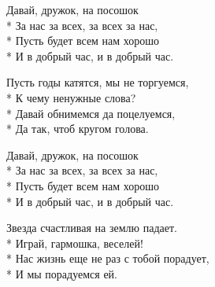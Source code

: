 \medskip

\begin{minipage}{\linewidth}
\hspace*{1.5em}Давай, дружок, на посошок\\*
\hspace*{1.5em}За нас за всех, за всех за нас,\\*
\hspace*{1.5em}Пусть будет всем нам хорошо\\*
\hspace*{1.5em}И в добрый час, и в добрый час.\\
\end{minipage}\par\medskip\nobreak

\medskip

\begin{minipage}{\linewidth}
Пусть годы катятся, мы не торгуемся,\\*
К чему ненужные слова?\\*
Давай обнимемся да поцелуемся,\\*
Да так, чтоб кругом голова.\\
\end{minipage}\par\medskip\nobreak

\medskip

\begin{minipage}{\linewidth}
\hspace*{1.5em}Давай, дружок, на посошок\\*
\hspace*{1.5em}За нас за всех, за всех за нас,\\*
\hspace*{1.5em}Пусть будет всем нам хорошо\\*
\hspace*{1.5em}И в добрый час, и в добрый час.\\
\end{minipage}\par\medskip\nobreak

\medskip

\begin{minipage}{\linewidth}
Звезда счастливая на землю падает.\\*
Играй, гармошка, веселей!\\*
Нас жизнь еще не раз с тобой порадует,\\*
И мы порадуемся ей.\\
\end{minipage}\par\medskip\nobreak

